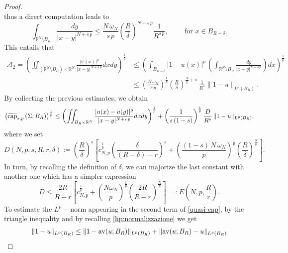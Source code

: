 \documentclass{amsart}
\theoremstyle{definition}
\numberwithin{equation}{section}
\begin{document}
\begin{proof}
\[	\]
	thus a direct computation leads to 
	\[
	\int_{\mathbb{R}^N \setminus B_{R}}\frac{dy}{|x-y|^{N+s\,p}} \le \frac{N\,\omega_N}{s\,p} \left(\frac{R}{\delta}\right)^{N+s\,p}\frac{1}{R^{s\,p}}, \qquad \mbox{ for } x \in B_{R-\delta}.
	\]
	This entails that  
	\[
	\begin{split}
		\mathcal{A}_2 = \left(\iint_{\left(\mathbb{R}^N \setminus B_{R}\right) \times \mathbb{R}^N}\frac{|\psi(x)|^p}{|x-y|^{N+s\,p}}dxdy \right)^{\frac{1}{p}} &\le \left(\int_{B_{R-\delta}} |1-u(x)|^p\,\left( \int_{\mathbb{R}^N \setminus B_{R}} \frac{dy}{|x-y|^{N+s\,p}}\right)dx\right)^{\frac{1}{p}}\\
		&\le \left(\frac{N\,\omega_N}{s\,p}\right)^{\frac{1}{p}} \left(\frac{R}{\delta}\right)^{\frac{N}{p}+s}\,\frac{1}{R^{s}} \|1 - u\|_{L^p(B_{R})}. 
	\end{split}
	\] 
	By collecting the previous estimates, we obtain 
	\begin{equation} \label{quasi-cap}
		\begin{split}
			\left(\widetilde{\rm cap}_{s,p}\left(\Sigma; B_{R}\right)\right)^{\frac{1}{p}} \le \left(\iint_{B_{R} \times \mathbb{R}^N} \frac{|u(x) - u(y)|^p}{|x-y|^{N+s\,p}}dxdy\right)^{\frac{1}{p}} 
			+ \left(\frac{1}{s\,(1-s)}\right)^{\frac{1}{p}} \frac{D}{R^s}\,\|1-u\|_{L^p(B_{R})},
		\end{split}
	\end{equation}
	where we set 
	\begin{equation*} \label{costante-D}
		D\left(N, p, s, R, r, \delta\right) := \left(\frac{R}{\delta}\right)^s\left[c_{N,p}^{\frac{1}{p}}\left(\frac{\delta}{(R-\delta)-r}\right)^s + \left(\frac{(1-s)\,N\,\omega_N}{p}\right)^{\frac{1}{p}} \left(\frac{R}{\delta}\right)^{\frac{N}{p}}\right].
	\end{equation*}
	In turn, by recalling the definition of $\delta$, we can majorize the last constant with another one which has a simpler expression 
	\begin{equation} \label{costante-E}
		D \le \frac{2R}{R-r} \left[c_{N,p}^{\frac{1}{p}} + \left(\frac{N \omega_N}{p}\right)^{\frac{1}{p}} \left(\frac{2R}{R-r}\right)^{\frac{N}{p}}\right] =: E\left(N,p, \frac{R}{r}\right).
	\end{equation}
	To estimate the $L^p-$norm appearing in the second term of \eqref{quasi-cap}, by the triangle inequality and by recalling \eqref{hp:normalizzazione} we get
	\[
	\begin{split}
		\|1 - u\|_{L^p(B_{R})} &\le \|1-{\rm av}(u; B_{R})\|_{L^p(B_{R})} + \|{\rm av}(u; B_{R}) - u\|_{L^p(B_{R})} \\

\end{split}\]
\end{proof}
\end{document}
